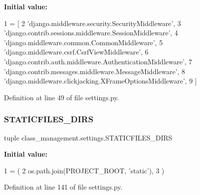 {\bfseries Initial value\+:}
\begin{DoxyCode}
1 =  [
2     \textcolor{stringliteral}{'django.middleware.security.SecurityMiddleware'},
3     \textcolor{stringliteral}{'django.contrib.sessions.middleware.SessionMiddleware'},
4     \textcolor{stringliteral}{'django.middleware.common.CommonMiddleware'},
5     \textcolor{stringliteral}{'django.middleware.csrf.CsrfViewMiddleware'},
6     \textcolor{stringliteral}{'django.contrib.auth.middleware.AuthenticationMiddleware'},
7     \textcolor{stringliteral}{'django.contrib.messages.middleware.MessageMiddleware'},
8     \textcolor{stringliteral}{'django.middleware.clickjacking.XFrameOptionsMiddleware'},
9 ]
\end{DoxyCode}


Definition at line 49 of file settings.\+py.

\hypertarget{namespaceclass__management_1_1settings_a811d4bb6812b65cced7610257af4ed37}{}\label{namespaceclass__management_1_1settings_a811d4bb6812b65cced7610257af4ed37} 
\subsubsection{\texorpdfstring{S\+T\+A\+T\+I\+C\+F\+I\+L\+E\+S\+\_\+\+D\+I\+RS}{STATICFILES\_DIRS}}
{\footnotesize\ttfamily tuple class\+\_\+management.\+settings.\+S\+T\+A\+T\+I\+C\+F\+I\+L\+E\+S\+\_\+\+D\+I\+RS}

{\bfseries Initial value\+:}
\begin{DoxyCode}
1 =  (
2     os.path.join(PROJECT\_ROOT, \textcolor{stringliteral}{'static'}),
3 )
\end{DoxyCode}


Definition at line 141 of file settings.\+py.

\hypertarget{namespaceclass__management_1_1settings_a763764029757e78f0fec9516759243b7}{}\label{namespaceclass__management_1_1settings_a763764029757e78f0fec9516759243b7} 

